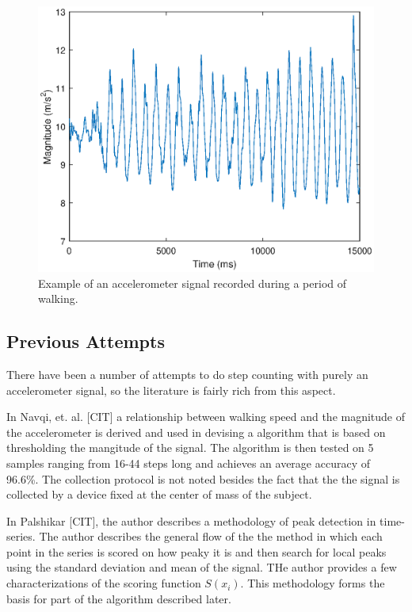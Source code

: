                 \begin{figure}[h]
                    \includegraphics[width=\textwidth]{Images/accel_signal.eps}
                    \centering
                    \caption{Example of an accelerometer signal recorded during a period of walking.}
                    \label{img_accel_ex}
                \end{figure}

            \subsection{Previous Attempts}

                There have been a number of attempts to do step counting with purely an accelerometer signal, so the literature is fairly rich from this aspect. 

                In Navqi, et. al. [CIT] a relationship between walking speed and the magnitude of the accelerometer is derived and used in devising a algorithm that is based on thresholding the mangitude of the signal. The algorithm is then tested on 5 samples ranging from 16-44 steps long and achieves an average accuracy of 96.6\%. The collection protocol is not noted besides the fact that the the signal is collected by a device fixed at the center of mass of the subject.

                In Palshikar [CIT], the author describes a methodology of peak detection in time-series. The author describes the general flow of the the method in which each point in the series is scored on how peaky it is and then search for local peaks using the standard deviation and mean of the signal. THe author provides a few characterizations of the scoring function $S(x_i)$. This methodology forms the basis for part of the algorithm described later.

